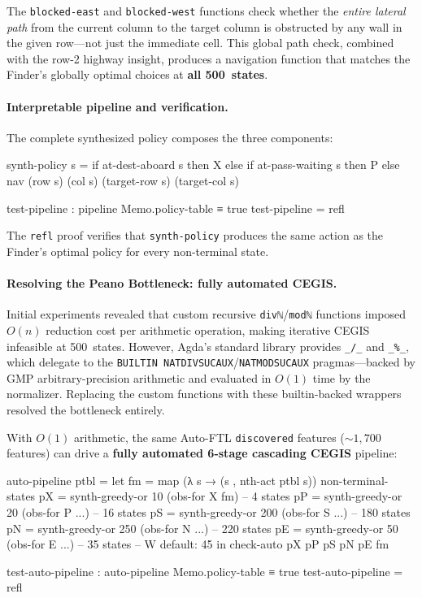 \noindent The \texttt{blocked-east} and \texttt{blocked-west} functions check whether the \emph{entire lateral path} from the current column to the target column is obstructed by any wall in the given row---not just the immediate cell.  This global path check, combined with the row-2 highway insight, produces a navigation function that matches the Finder's globally optimal choices at \textbf{all 500~states}.

\paragraph{Interpretable pipeline and verification.}
The complete synthesized policy composes the three components:

\begin{spec}
synth-policy s =
  if at-dest-aboard s then X
  else if at-pass-waiting s then P
  else nav (row s) (col s) (target-row s) (target-col s)

test-pipeline : pipeline Memo.policy-table ≡ true
test-pipeline = refl
\end{spec}

\noindent The \texttt{refl} proof verifies that \texttt{synth-policy} produces the same action as the Finder's optimal policy for every non-terminal state.

\paragraph{Resolving the Peano Bottleneck: fully automated CEGIS.}
Initial experiments revealed that custom recursive \texttt{divℕ}/\texttt{modℕ} functions imposed $O(n)$ reduction cost per arithmetic operation, making iterative CEGIS infeasible at 500~states.  However, Agda's standard library provides \texttt{\_/\_} and \texttt{\_\%\_}, which delegate to the \texttt{BUILTIN NATDIVSUCAUX}/\texttt{NATMODSUCAUX} pragmas---backed by GMP arbitrary-precision arithmetic and evaluated in $O(1)$ time by the normalizer.  Replacing the custom functions with these builtin-backed wrappers resolved the bottleneck entirely.

With $O(1)$ arithmetic, the same Auto-FTL \texttt{discovered} features (${\sim}1{,}700$ features) can drive a \textbf{fully automated 6-stage cascading CEGIS} pipeline:

\begin{spec}
auto-pipeline ptbl =
  let fm   = map (λ s → (s , nth-act ptbl s)) non-terminal-states
      pX   = synth-greedy-or 10  (obs-for X fm)   -- 4 states
      pP   = synth-greedy-or 20  (obs-for P ...)   -- 16 states
      pS   = synth-greedy-or 200 (obs-for S ...)   -- 180 states
      pN   = synth-greedy-or 250 (obs-for N ...)   -- 220 states
      pE   = synth-greedy-or 50  (obs-for E ...)   -- 35 states
                                                    -- W default: 45
  in check-auto pX pP pS pN pE fm

test-auto-pipeline : auto-pipeline Memo.policy-table ≡ true
test-auto-pipeline = refl
\end{spec}

